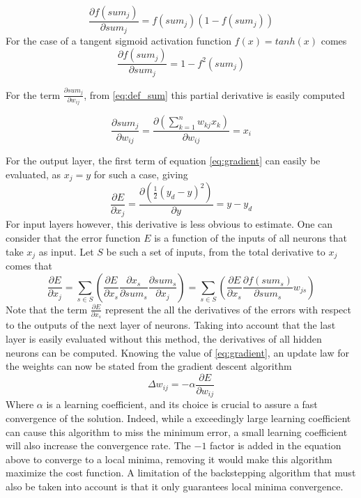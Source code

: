 \begin{equation}
\frac{\partial f(sum_j)}{\partial sum_j}=f(sum_j)(1-f(sum_j))
\end{equation}
For the case of a tangent sigmoid activation function $f(x)=tanh(x)$ comes
\begin{equation}
\frac{\partial f(sum_j)}{\partial sum_j}=1-f^2(sum_j)
\end{equation}

For the term $\frac{\partial sum_j}{\partial w_{ij}}$, from \ref{eq:def_sum} this partial derivative is easily computed

\begin{equation}
\frac{\partial sum_j}{\partial w_{ij}} = \frac{\partial \left(\sum ^n_{k=1} w_{kj} x_k\right)}{\partial w_{ij}} = x_i
\end{equation}

For the output layer, the first term of equation \ref{eq:gradient} can easily be evaluated, as $x_j=y$ for such a case, giving
\begin{equation}
\frac{\partial E}{\partial x_j}=\frac{\partial (\frac{1}{2} (y_d-y)^2)}{\partial y}= y-y_d
\end{equation}
For input layers however, this derivative is less obvious to estimate. One can consider that the error function $E$ is a function of the inputs of all neurons that take $x_j$ as input. Let $S$ be such a set of inputs, from the total derivative to $x_j$ comes that
\begin{equation}
\frac{\partial E}{\partial x_j} = \sum _{s\in S}\left( \frac{\partial E}{\partial x_s}\frac{\partial x_s}{\partial sum_s}\frac{\partial sum_s}{\partial x_j}\right)=\sum _{s\in S}\left( \frac{\partial E}{\partial x_s}\frac{\partial f(sum_s)}{\partial sum_s}w_{js}\right)
\end{equation}
Note that the term $ \frac{\partial E}{\partial x_s} $ represent the all the derivatives of the errors with respect to the outputs of the next layer of neurons. Taking into account that the last layer is easily evaluated without this method, the derivatives of all hidden neurons can be computed. Knowing the value of \ref{eq:gradient}, an update law for the weights can now be stated from the gradient descent algorithm
\begin{equation}\label{eq:update_law}
\Delta w_{ij} = - \alpha \frac{\partial E}{\partial w_{ij}}
\end{equation}
Where $\alpha$ is a learning coefficient, and its choice is crucial to assure a fast convergence of the solution. Indeed, while a exceedingly large learning coefficient can cause this algorithm to miss the minimum error, a small learning coefficient will also increase the convergence rate. The $-1$ factor is added in the equation above to converge to a local minima, removing it would make this algorithm maximize the cost function. A limitation of the backstepping algorithm that must also be taken into account is that it only guarantees local minima convergence. 

